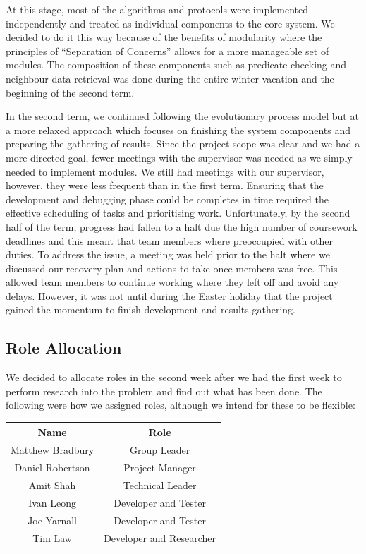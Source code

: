 At this stage, most of the algorithms and protocols were implemented independently and treated as individual components to the core system. We decided to do it this way because of the benefits of modularity where the principles of ``Separation of Concerns'' \cite[p.~99]{pressman2010software} allows for a more manageable set of modules. The composition of these components such as predicate checking and neighbour data retrieval was done during the entire winter vacation and the beginning of the second term.

In the second term, we continued following the evolutionary process model but at a more relaxed approach which focuses on finishing the system components and preparing the gathering of results. Since the project scope was clear and we had a more directed goal, fewer meetings with the supervisor was needed as we simply needed to implement modules. We still had meetings with our supervisor, however, they were less frequent than in the first term. Ensuring that the development and debugging phase could be completes in time required the effective scheduling of tasks and prioritising work. Unfortunately, by the second half of the term, progress had fallen to a halt due the high number of coursework deadlines and this meant that team members where preoccupied with other duties. To address the issue, a meeting was held prior to the halt where we discussed our recovery plan and actions to take once members was free. This allowed team members to continue working where they left off and avoid any delays. However, it was not until during the Easter holiday that the project gained the momentum to finish development and results gathering.

\subsection{Role Allocation}

We decided to allocate roles in the second week after we had the first week to perform research into the problem and find out what has been done. The following were how we assigned roles, although we intend for these to be flexible:

\begin{table}[H]
\centering
	\begin{tabular}{| c | c |}
		\hline
		Name & Role\\
		\hline
		Matthew Bradbury & Group Leader\\
		Daniel Robertson & Project Manager\\
		Amit Shah & Technical Leader\\
		Ivan Leong & Developer and Tester\\
		Joe Yarnall & Developer and Tester\\
		Tim Law & Developer and Researcher\\
		\hline
	\end{tabular}
\end{table}

